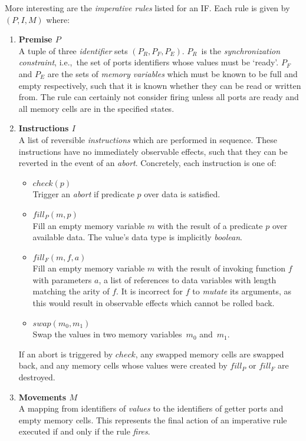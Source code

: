 More interesting are the \textit{imperative rules} listed for an IF. Each rule is given by $(P,I,M)$ where:
\begin{enumerate}
	\item \textbf{Premise $P$}\\
	A tuple of three \textit{identifier} sets $(P_R, P_F, P_E)$. $P_R$~is the \textit{synchronization constraint}, i.e.,\ the set of ports identifiers whose values must be `ready'. $P_F$ and $P_E$ are the sets of \textit{memory variables} which must be known to be full and empty respectively, such that it is known whether they can be read or written from. The rule can certainly not consider firing unless all ports are ready and all memory cells are in the specified states.
	
	\item \textbf{Instructions $I$}\\
	A list of reversible \textit{instructions} which are performed in sequence. These instructions have no immediately observable effects, such that they can be reverted in the event of an \textit{abort}. Concretely, each instruction is one of:
	\begin{itemize}
		\item $check(p)$\\
		Trigger an \textit{abort} if predicate $p$ over data is satisfied.
		\item $fill_P(m, p)$\\Fill an empty memory variable $m$ with the result of a predicate $p$ over available data. The value's data type is implicitly \textit{boolean}.
		\item $fill_F(m, f, a)$\\
		Fill an empty memory variable $m$ with the result of invoking function $f$ with parameters $a$, a list of references to data variables with length matching the arity of $f$. It is incorrect for $f$ to \textit{mutate} its arguments, as this would result in observable effects which cannot be rolled back.
		\item $swap(m_0,m_1)$\\
		Swap the values in two memory variables~$m_0$ and~$m_1$.
	\end{itemize}
	If an abort is triggered by $check$, any swapped memory cells are swapped back, and any memory cells whose values were created by $fill_P$ or $fill_F$ are destroyed.
	
	\item \textbf{Movements $M$}\\
	A mapping from identifiers of \textit{values} to the identifiers of getter ports and empty memory cells. This represents the final action of an imperative rule executed if and only if the rule \textit{fires}.
\end{enumerate}

